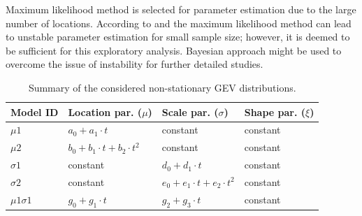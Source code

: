 Maximum likelihood method is selected for parameter estimation due to the large number of locations. According to \citet{Hosking1985} and \citet{Martins2000} the maximum likelihood method can lead to unstable parameter estimation for small sample size; however, it is deemed to be sufficient for this exploratory analysis. Bayesian approach might be used to overcome the issue of instability for further detailed studies.

\begin{table}[htbp!]
\caption{Summary of the considered non-stationary GEV distributions.}
\centering
\label{tab:nonstat_dist}
\small
    \begin{tabular}{llll}
    \toprule
    Model ID  & Location par. ($\mu$) & Scale par. ($\sigma$) & Shape par. ($\xi$) \\ 
    \midrule
    \rowcolor{lightgrey} $\mu 1$  & $a_0 + a_1 \cdot t$  & constant  & constant \\
    $\mu 2$  & $b_0 + b_1 \cdot t+ b_2 \cdot t^2$  & constant   & constant \\
    \rowcolor{lightgrey} $\sigma 1$  & constant  & $d_0 + d_1 \cdot t$  & constant \\
    $\sigma 2$  & constant  & $e_0 + e_1 \cdot t+ e_2 \cdot t^2$  & constant \\
    \rowcolor{lightgrey} $\mu 1\sigma 1$ & $g_0 + g_1 \cdot t$  & $g_2 + g_3 \cdot t$ & constant   \\ 
    \bottomrule
    \end{tabular}
\end{table}


